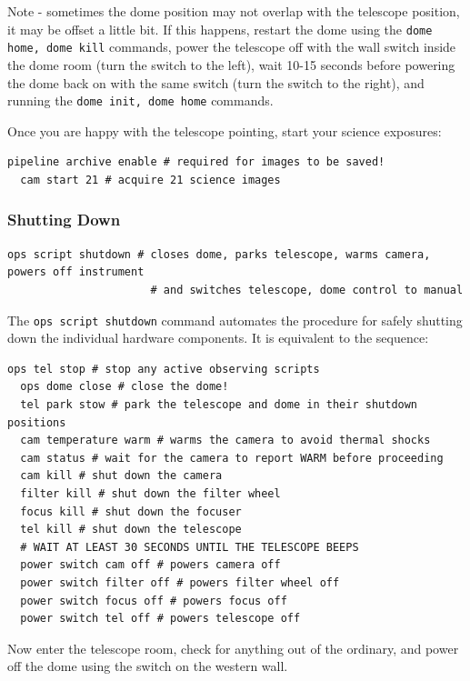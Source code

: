 \documentclass[12pt,a4paper]{article}
\begin{document}
Note - sometimes the dome position may not overlap with the telescope position, it may be offset a little bit. If this happens, restart the dome using the \texttt{dome home, dome kill} commands, power the telescope off with the wall switch inside the dome room (turn the switch to the left), wait 10-15 seconds before powering the dome back on with the same switch (turn the switch to the right), and running the \texttt{dome init, dome home} commands.

Once you are happy with the telescope pointing, start your science exposures:

\begin{lstlisting}[language=commands]
  pipeline archive enable # required for images to be saved!
  cam start 21 # acquire 21 science images
\end{lstlisting}

\subsubsection{Shutting Down}
\begin{lstlisting}[language=commands]
  ops script shutdown # closes dome, parks telescope, warms camera, powers off instrument
                      # and switches telescope, dome control to manual
\end{lstlisting}

The \texttt{ops script shutdown} command automates the procedure for safely shutting down the individual hardware components. It is equivalent to the sequence:
\\
\begin{lstlisting}[language=commands]
  ops tel stop # stop any active observing scripts
  ops dome close # close the dome!
  tel park stow # park the telescope and dome in their shutdown positions
  cam temperature warm # warms the camera to avoid thermal shocks
  cam status # wait for the camera to report WARM before proceeding
  cam kill # shut down the camera
  filter kill # shut down the filter wheel
  focus kill # shut down the focuser
  tel kill # shut down the telescope
  # WAIT AT LEAST 30 SECONDS UNTIL THE TELESCOPE BEEPS
  power switch cam off # powers camera off
  power switch filter off # powers filter wheel off
  power switch focus off # powers focus off
  power switch tel off # powers telescope off
\end{lstlisting}

Now enter the telescope room, check for anything out of the ordinary, and power off the dome using the switch on the western wall.
\end{document}
